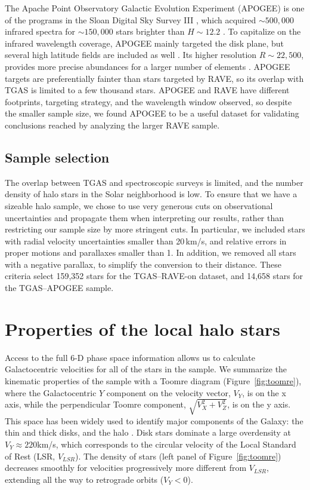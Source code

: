 \documentclass[apj, twocolappendix, numberedappendix, appendixfloats]{emulateapj}
\begin{document}
The Apache Point Observatory Galactic Evolution Experiment (APOGEE) is one of the programs in the Sloan Digital Sky Survey III \citep{majewski2015, sdss3}, which acquired $\sim500,000$ infrared spectra for $\sim150,000$ stars brighter than $H\sim12.2$ \citep{holtzman2015}.
To capitalize on the infrared wavelength coverage, APOGEE mainly targeted the disk plane, but several high latitude fields are included as well \citep{zasowski2013}.
Its higher resolution $R\sim22,500$, provides more precise abundances for a larger number of elements \citep[e.g.,][]{ness2015}.
APOGEE targets are preferentially fainter than stars targeted by RAVE, so its overlap with TGAS is limited to a few thousand stars.
APOGEE and RAVE have different footprints, targeting strategy, and the wavelength window observed, so despite the smaller sample size, we found APOGEE to be a useful dataset for validating conclusions reached by analyzing the larger RAVE sample.

\subsection{Sample selection}
\label{sample}
The overlap between TGAS and spectroscopic surveys is limited, and the number density of halo stars in the Solar neighborhood is low.
To ensure that we have a sizeable halo sample, we chose to use very generous cuts on observational uncertainties and propagate them when interpreting our results, rather than restricting our sample size by more stringent cuts.
In particular, we included stars with radial velocity uncertainties smaller than 20\,km/s, and relative errors in proper motions and parallaxes smaller than 1.
In addition, we removed all stars with a negative parallax, to simplify the conversion to their distance.
These criteria select 159,352 stars for the TGAS--RAVE-on dataset, and 14,658 stars for the TGAS--APOGEE sample.


\section{Properties of the local halo stars}
\label{sec:sample}
Access to the full 6-D phase space information allows us to calculate Galactocentric velocities for all of the stars in the sample.
We summarize the kinematic properties of the sample with a Toomre diagram (Figure~\ref{fig:toomre}), where the Galactocentric $Y$ component on the velocity vector, $V_Y$, is on the x axis, while the perpendicular Toomre component, $\sqrt{V_X^2+V_Z^2}$, is on the y axis. 
This space has been widely used to identify major components of the Galaxy: the thin and thick disks, and the halo \citep[e.g.,][]{venn2004}.
Disk stars dominate a large overdensity at $V_Y\approx220$\;km/s, which corresponds to the circular velocity of the Local Standard of Rest (LSR, $V_{LSR}$).
The density of stars (left panel of Figure~\ref{fig:toomre}) decreases smoothly for velocities progressively more different from $V_{LSR}$, extending all the way to retrograde orbits ($V_Y<0$).
\end{document}
